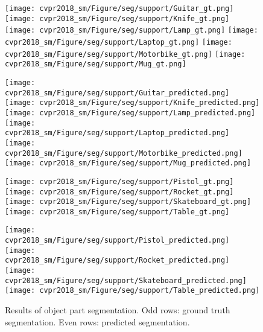 \documentclass[10pt,twocolumn,letterpaper]{article}
\begin{document}
\begin{figure*}[t]
        \vspace{15pt}
        
        \texttt{[image: cvpr2018\_sm/Figure/seg/support/Guitar\_gt.png]} \hspace{10pt}
        \texttt{[image: cvpr2018\_sm/Figure/seg/support/Knife\_gt.png]} \hspace{10pt}
        \texttt{[image: cvpr2018\_sm/Figure/seg/support/Lamp\_gt.png]} \hspace{10pt}
        \texttt{[image: cvpr2018\_sm/Figure/seg/support/Laptop\_gt.png]} \hspace{10pt}
        \texttt{[image: cvpr2018\_sm/Figure/seg/support/Motorbike\_gt.png]} \hspace{10pt}
        \texttt{[image: cvpr2018\_sm/Figure/seg/support/Mug\_gt.png]}
        
        \texttt{[image: cvpr2018\_sm/Figure/seg/support/Guitar\_predicted.png]} \hspace{10pt}
        \texttt{[image: cvpr2018\_sm/Figure/seg/support/Knife\_predicted.png]} \hspace{10pt}
        \texttt{[image: cvpr2018\_sm/Figure/seg/support/Lamp\_predicted.png]} \hspace{10pt}
        \texttt{[image: cvpr2018\_sm/Figure/seg/support/Laptop\_predicted.png]} \hspace{10pt}
        \texttt{[image: cvpr2018\_sm/Figure/seg/support/Motorbike\_predicted.png]} \hspace{10pt}
        \texttt{[image: cvpr2018\_sm/Figure/seg/support/Mug\_predicted.png]}
        
        \vspace{15pt}
        
        \texttt{[image: cvpr2018\_sm/Figure/seg/support/Pistol\_gt.png]} \hspace{10pt}
        \texttt{[image: cvpr2018\_sm/Figure/seg/support/Rocket\_gt.png]} \hspace{10pt}
        \texttt{[image: cvpr2018\_sm/Figure/seg/support/Skateboard\_gt.png]} \hspace{10pt}
        \texttt{[image: cvpr2018\_sm/Figure/seg/support/Table\_gt.png]}
    
        \texttt{[image: cvpr2018\_sm/Figure/seg/support/Pistol\_predicted.png]} \hspace{10pt}
        \texttt{[image: cvpr2018\_sm/Figure/seg/support/Rocket\_predicted.png]} \hspace{10pt}
        \texttt{[image: cvpr2018\_sm/Figure/seg/support/Skateboard\_predicted.png]} \hspace{10pt}
        \texttt{[image: cvpr2018\_sm/Figure/seg/support/Table\_predicted.png]}
        
        \caption{Results of object part segmentation. Odd rows: ground truth segmentation. Even rows: predicted segmentation.}
        \label{fig_seg_results}

\end{figure*}
\end{document}
